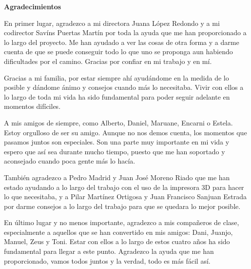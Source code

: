 {\huge \textbf{Agradecimientos}}

\vspace{1cm}

En primer lugar, agradezco a mi directora Juana López Redondo y a mi codirector Savíns Puertas Martín por toda la ayuda que me han proporcionado a lo largo del proyecto. Me han ayudado a ver las cosas de otra forma y a darme cuenta de que se puede conseguir todo lo que uno se proponga aun habiendo dificultades por el camino. Gracias por confiar en mi trabajo y en mí.

Gracias a mi familia, por estar siempre ahí ayudándome en la medida de lo posible y dándome ánimo y consejos cuando más lo necesitaba. Vivir con ellos a lo largo de toda mi vida ha sido fundamental para poder seguir adelante en momentos difíciles.

A mis amigos de siempre, como Alberto, Daniel, Maruane, Encarni o Estela. Estoy orgulloso de ser su amigo. Aunque no nos demos cuenta, los momentos que pasamos juntos son especiales. Son una parte muy importante en mi vida y espero que así sea durante mucho tiempo, puesto que me han soportado y aconsejado cuando poca gente más lo hacía.

También agradezco a Pedro Madrid y Juan José Moreno Riado que me han estado ayudando a lo largo del trabajo con el uso de la impresora 3D para hacer lo que necesitaba, y a Pilar Martínez Ortigosa y Juan Francisco Sanjuan Estrada por darme consejos a lo largo del trabajo para que se quedara lo mejor posible.

En último lugar y no menos importante, agradezco a mis compañeros de clase, especialmente a aquellos que se han convertido en mis amigos: Dani, Juanjo, Manuel, Zeus y Toni. Estar con ellos a lo largo de estos cuatro años ha sido fundamental para llegar a este punto. Agradezco la ayuda que me han proporcionado, vamos todos juntos y la verdad, todo es más fácil así.